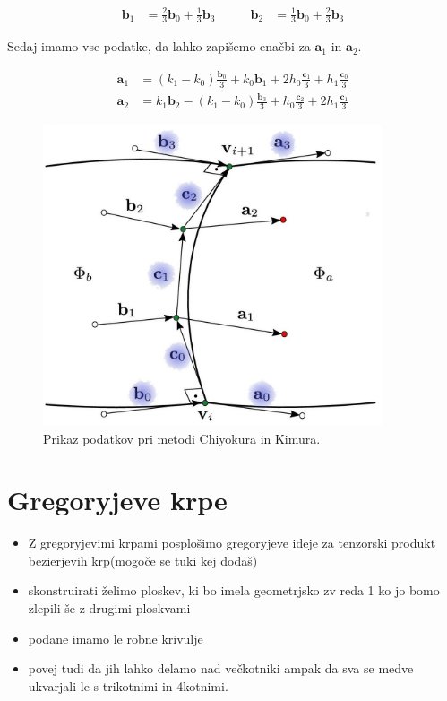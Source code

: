 \documentclass[a4paper,12pt]{article}
\newcommand{\tbf}{\textbf}
\begin{document}
	\begin{equation*}
		\begin{split}
			\tbf{b}_1 &= \frac{2}{3}\tbf{b}_0 + \frac{1}{3}\tbf{b}_3
		\end{split}
		\quad\quad
		\begin{split}
			\tbf{b}_2 &= \frac{1}{3}\tbf{b}_0 + \frac{2}{3}\tbf{b}_3
		\end{split}
	\end{equation*}

	Sedaj imamo vse podatke, da lahko zapišemo enačbi za $\textbf{a}_1$ in $\textbf{a}_2$.

	\begin{align*}
		\tbf{a}_1 &= (k_1 - k_0)\frac{\tbf{b}_0}{3} + k_0\tbf{b}_1 + 2h_0\frac{\tbf{c}_1}{3} + h_1\frac{\tbf{c}_0}{3} \\
		\tbf{a}_2 &= k_1\tbf{b}_2 - (k_1 - k_0)\frac{\tbf{b}_3}{3} + h_0\frac{\tbf{c}_2}{3} + 2h_1\frac{\tbf{c}_1}{3}
	\end{align*}

	\begin{figure}[h]
		\centering
		\includegraphics[width=10cm]{metoda_CinK_pobarvano.jpg}
		\caption{Prikaz podatkov pri metodi Chiyokura in Kimura.}
		\label{fig:chi_ki_metoda}
	\end{figure}


\section{Gregoryjeve krpe}


\begin{itemize}
	\item Z gregoryjevimi krpami posplošimo gregoryjeve ideje za tenzorski produkt bezierjevih krp(mogoče se tuki kej dodaš)
	\item skonstruirati želimo ploskev, ki bo imela geometrjsko zv reda 1 ko jo bomo zlepili še z drugimi ploskvami
	\item podane imamo le robne krivulje
	\item povej tudi da jih lahko delamo nad večkotniki ampak da sva se medve ukvarjali le s trikotnimi in 4kotnimi.
\end{itemize}
\end{document}
